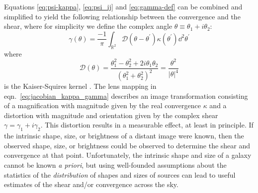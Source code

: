 Equations \ref{eq:psi-kappa}, \ref{eq:psi_ij} and \ref{eq:gamma-def} can be combined and simplified to yield the following relationship between the convergence and the shear, where for simplicity we define the complex angle
$\theta \equiv \theta_1 + i\theta_2$:
\begin{equation}
  \label{eq:gamma-kappa}
  \gamma(\theta) 
  = \frac{-1}{\pi}\int_{\mathbb{R}^2} \mathcal{D}(\theta - 
  \theta^\prime)\kappa(\theta^\prime) \dd^2\theta^\prime
\end{equation}
where 
\begin{equation}
  \label{eq:scriptD}
  \mathcal{D}(\theta) 
  = \frac{\theta_1^2 - \theta_2^2 + 2i\theta_1\theta_2}{(\theta_1^2+\theta_2^2)^2}
  = \frac{\theta^2}{|\theta|^4}
\end{equation}
is the Kaiser-Squires kernel \citep{Kaiser93}.
The lens mapping in eqn.~\ref{eq:jacobian_kappa_gamma} describes an
image transformation consisting of a magnification with magnitude 
given by the real convergence $\kappa$
and a distortion with magnitude and orientation given by the complex shear
$\gamma = \gamma_1 + i\gamma_2$.  This distortion results in a measurable
effect, at least in principle.  If the intrinsic shape, size, or brightness
of a distant image were known, then the observed shape, size, or brightness
could be observed to determine the shear and convergence at that point.
Unfortunately, the intrinsic shape and size of a galaxy cannot be known
{\it a priori}, but using well-founded assumptions about the statistics
of the {\it distribution} of shapes and sizes of sources can lead to
useful estimates of the shear and/or convergence across the sky.


